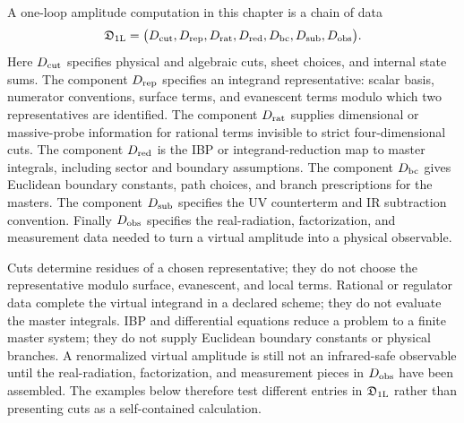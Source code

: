 \begin{definition}
\label{def:one-loop-reconstruction-datum}
A one-loop amplitude computation in this chapter is a chain of data
\[
  \mathfrak D_{1{\rm L}}
  =
  \bigl(
    D_{\rm cut},D_{\rm rep},D_{\rm rat},D_{\rm red},
    D_{\rm bc},D_{\rm sub},D_{\rm obs}
  \bigr).
\]
Here \(D_{\rm cut}\) specifies physical and algebraic cuts, sheet choices,
and internal state sums.  The component \(D_{\rm rep}\) specifies an integrand
representative: scalar basis, numerator conventions, surface terms, and
evanescent terms modulo which two representatives are identified.  The component
\(D_{\rm rat}\) supplies dimensional or massive-probe information for
rational terms invisible to strict four-dimensional cuts.  The component
\(D_{\rm red}\) is the IBP or integrand-reduction map to master integrals,
including sector and boundary assumptions.  The component \(D_{\rm bc}\) gives
Euclidean boundary constants, path choices, and branch prescriptions for the
masters.  The component \(D_{\rm sub}\) specifies the UV counterterm and IR
subtraction convention.  Finally \(D_{\rm obs}\) specifies the real-radiation,
factorization, and measurement data needed to turn a virtual amplitude into
a physical observable.
\end{definition}

Cuts determine residues of a chosen representative; they do not choose the
representative modulo surface, evanescent, and local terms.  Rational or
regulator data complete the virtual integrand in a declared scheme; they do
not evaluate the master integrals.  IBP and differential equations reduce a
problem to a finite master system; they do not supply Euclidean boundary
constants or physical branches.  A renormalized virtual amplitude is still
not an infrared-safe observable until the real-radiation, factorization, and
measurement pieces in \(D_{\rm obs}\) have been assembled.  The examples below
therefore test different entries in \(\mathfrak D_{1{\rm L}}\) rather than
presenting cuts as a self-contained calculation.

